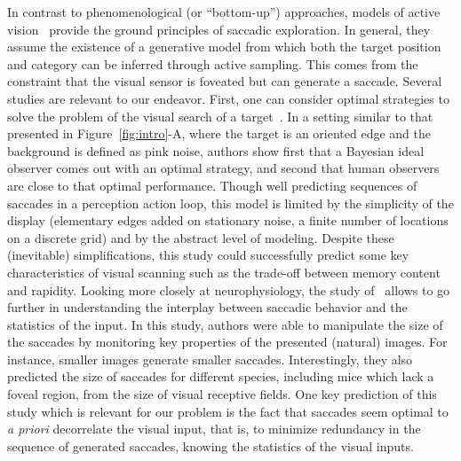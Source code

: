 In contrast to phenomenological (or ``bottom-up'') approaches, models of active vision~\citep{Najemnik05,Butko2010infomax,Friston12} provide the ground principles of saccadic exploration. In general, they assume the existence of a generative model from which both the target position and category can be inferred through active sampling. This comes from the constraint that the visual sensor is foveated but can generate a saccade. 
Several studies are relevant to our endeavor. First, one can consider optimal strategies to solve the problem of the visual search of a target~\citep{Najemnik05}. In a setting similar to that presented in Figure~\ref{fig:intro}-A, where the target is an oriented edge and the background is defined as pink noise, authors show first that a Bayesian ideal observer comes out with an optimal strategy, and second that human observers are close to that optimal performance. Though well predicting sequences of saccades in a perception action loop, this model is limited by the simplicity of the display (elementary edges added on stationary noise, a finite number of locations on a discrete grid) and by the abstract level of modeling. Despite these (inevitable) simplifications, this study could successfully predict some key characteristics of visual scanning such as the trade-off between memory content and rapidity. Looking more closely at neurophysiology, the study of~\citep{Samonds18} allows to go further in understanding the interplay between saccadic behavior and the statistics of the input. In this study, authors were able to manipulate the size of the saccades by monitoring key properties of the presented (natural) images. For instance, smaller images generate smaller saccades. Interestingly, they also predicted the size of saccades for different species, including mice which lack a foveal region, from the size of visual receptive fields. One key prediction of this study which is relevant for our problem is the fact that saccades seem optimal to \emph{a priori} decorrelate the visual input, that is, to minimize redundancy in the sequence of generated saccades, knowing the statistics of the visual inputs.

